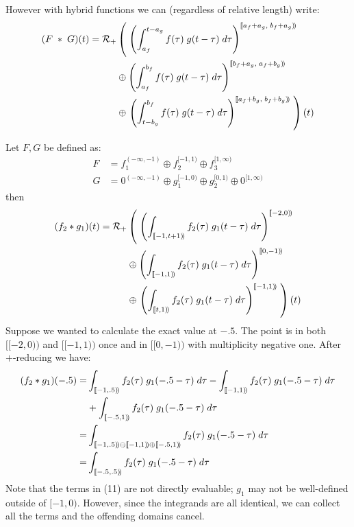 \documentclass{letter}
\begin{document}
	However with hybrid functions we can (regardless of relative length) write:
	\begin{align}
	(F \;*\; G) (t) = 
		\mathcal{R}_+ &\left( \; \left( 
			\int_{a_f}^{t-a_g} f(\tau) \; g(t-\tau) \; d\tau \right)^{[\![a_f+a_g,\; b_f+a_g)\!)} 
				\right. \notag \\ &\oplus \left( 
			\int_{a_f}^{b_f} f(\tau) \; g(t-\tau) \; d\tau \right)^{[\![b_f+a_g,\; a_f+b_g)\!)} 
				\notag \\ &\oplus \left. \left( 
			\int_{t-b_g}^{b_f} f(\tau) \; g(t-\tau) \; d\tau \right)^{[\![a_f+b_g,\; b_f+b_g)\!)} 
				\; \right)(t)
	\end{align}
	
	Let $F, G$ be defined as:
	\begin{align}
		F &= f_1^{(-\infty, -1)} \oplus f_2^{[-1,1)} \oplus f_3^{[1,\infty)} \\
		G &= 0^{(-\infty, -1)} \oplus g_1^{[-1, 0)} \oplus g_2^{[0,1)} \oplus 0^{[1,\infty)}	
	\end{align}	
	then 
	\begin{align}
	(f_2 * g_1)(t) = 
		\mathcal{R}_+ &\left( \; \left( 
			\int_{[\![-1,t+1)\!)} f_2(\tau) \; g_1(t-\tau) \; d\tau \right)^{[\![-2,0)\!)} 
				\right. \notag \\ &\oplus \left( 
			\int_{[\![-1,1)\!)} f_2(\tau) \; g_1(t-\tau) \; d\tau \right)^{[\![0,-1)\!)} 
				\notag \\ &\oplus \left. \left( 
			\int_{[\![t,1)\!)} f_2(\tau) \; g_1(t-\tau) \; d\tau \right)^{[\![-1,1)\!)} 
				\; \right)(t)
	\end{align}
	Suppose we wanted to calculate the exact value at $-.5$. 
	The point is in both $[\![-2,0)\!)$ and $[\![-1, 1)\!)$ once and in $[\![0,-1)\!)$ with multiplicity negative one.
	After $+$-reducing we have:
	\begin{align}
	(f_2 * g_1)(-.5) =& 
		\int_{[\![-1, .5)\!)} f_2(\tau) \; g_1(-.5-\tau) \; d\tau - 
		\int_{[\![-1, 1)\!)} f_2(\tau) \; g_1(-.5-\tau) \; d\tau \notag \\
		& + \int_{[\![-.5, 1)\!)} f_2(\tau) \; g_1(-.5-\tau) \; d\tau \\
		=& \int_{[\![-1, .5)\!) \ominus [\![-1,1)\!) \oplus [\![-.5,1)\!)} f_2(\tau) \; g_1(-.5-\tau) \; d\tau \\
		=& \int_{[\![-.5,.5)\!)} f_2(\tau) \; g_1(-.5-\tau) \; d\tau
	\end{align}
	Note that the terms in (11) are not directly evaluable; $g_1$ may not be well-defined outside of $[-1,0)$.
	However, since the integrands are all identical, we can collect all the terms and the offending domains cancel.
	
\end{document}
